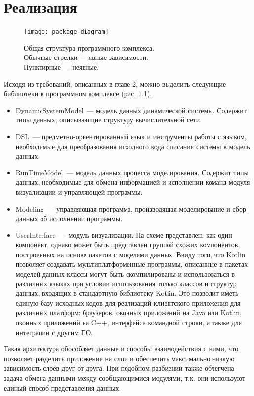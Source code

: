 \chapter{Реализация}

\begin{figure}[h]
	\centering
	\texttt{[image: package-diagram]}
	\caption{Общая структура программного комплекса.\\Обычные стрелки --- явные зависимости.\\Пунктирные --- неявные.}
	\label{fig:package-diagram}
\end{figure}
\FloatBarrier
Исходя из требований, описанных в главе 2, можно выделить следующие библиотеки в программном комплексе (рис. \ref{fig:package-diagram}).
\begin{itemize}
	\item DynamicSystemModel~--- модель данных динамической системы. Содержит типы данных, описывающие структуру вычислительной сети.
	\item DSL~--- предметно-ориентированный язык и инструменты работы с языком, необходимые для преобразования исходного кода описания системы в модель данных.
	\item RunTimeModel~--- модель данных процесса моделирования. Содержит типы данных, необходимые для обмена информацией и исполнении команд модуля визуализации и управляющей программы.
	\item Modeling~--- управляющая программа, производящая моделирование и сбор данных об исполнении программы.
	\item UserInterface~--- модуль визуализации. 
	На схеме представлен, как один компонент, однако может быть представлен группой схожих компонентов, построенных на основе пакетов с моделями данных. 
	Ввиду того, что Kotlin позволяет создавать мультиплатформенные программы, описанные в пакетах моделей данных классы могут быть скомпилированы и использоваться в различных языках при условии использования только классов и структур данных, входящих в стандартную библиотеку Kotlin. 
	Это позволит иметь единую базу исходных кодов для реализаций клиентского приложения для различных платформ: браузеров, оконных приложений на Java или Kotlin, оконных приложений на C++, интерфейса командной строки, а также для интеграции с другим ПО.
\end{itemize}

Такая архитектура обособляет данные и способы взаимодействия с ними, что позволяет разделить приложение на слои и обеспечить максимально низкую зависимость слоёв друг от друга.
При подобном разбиении также облегчена задача обмена данными между сообщающимися модулями, т.к. они используют единый способ представления данных.

